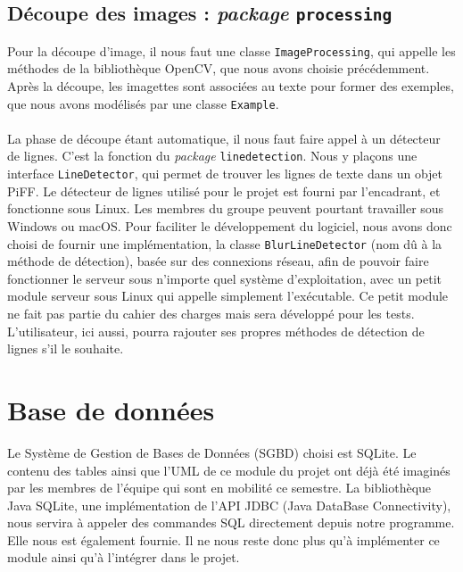 \subsection{Découpe des images : \textit{package} \texttt{processing}}

Pour la découpe d'image, il nous faut une classe \texttt{ImageProcessing}, qui appelle les méthodes de la bibliothèque OpenCV, que nous avons choisie précédemment. Après la découpe, les imagettes sont associées au texte pour former des exemples, que nous avons modélisés par une classe \texttt{Example}. 

\paragraph{}
La phase de découpe étant automatique, il nous faut faire appel à un détecteur de lignes. C'est la fonction du \textit{package} \texttt{linedetection}. Nous y plaçons une interface \texttt{LineDetector}, qui permet de trouver les lignes de texte dans un objet PiFF. Le détecteur de lignes utilisé pour le projet est fourni par l'encadrant, et fonctionne sous Linux. Les membres du groupe peuvent pourtant travailler sous Windows ou macOS. Pour faciliter le développement du logiciel, nous avons donc choisi de fournir une implémentation, la classe \texttt{BlurLineDetector} (nom dû à la méthode de détection), basée sur des connexions réseau, afin de pouvoir faire fonctionner le serveur sous n'importe quel système d'exploitation, avec un petit module serveur sous Linux qui appelle simplement l'exécutable. Ce petit module ne fait pas partie du cahier des charges mais sera développé pour les tests. L'utilisateur, ici aussi, pourra rajouter ses propres méthodes de détection de lignes s'il le souhaite.

\section{Base de données}

Le Système de Gestion de Bases de Données (SGBD) choisi est SQLite. Le contenu des tables ainsi que l'UML de ce module du projet ont déjà été imaginés par les membres de l'équipe qui sont en mobilité ce semestre. La bibliothèque Java SQLite, une implémentation de l'API JDBC (Java DataBase Connectivity), nous servira à appeler des commandes SQL directement depuis notre programme. Elle nous est également fournie. Il ne nous reste donc plus qu'à implémenter ce module ainsi qu'à l'intégrer dans le projet.

